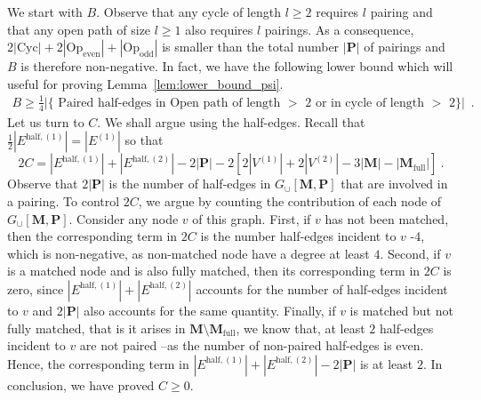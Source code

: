 \documentclass{article}
\begin{document}
We start with $B$. Observe that any cycle of length $l\geq 2$ requires $l$ pairing and that any open path of size $l\geq 1$ also requires $l$ pairings. As a consequence, $2|\mathrm{Cyc}| + 2|\mathrm{Op}_{\mathrm{even}}|+ |\mathrm{Op}_{\mathrm{odd}}|$ is smaller than the total number $|\mathbf{P}|$ of pairings and $B$ is therefore non-negative. In fact, we have the following lower bound which will useful for proving Lemma~\ref{lem:lower_bound_psi}. 
\begin{eqnarray}\label{eq:interpretation_B}
    B\geq \frac{1}{4}|\{\text{ Paired half-edges in Open path of length $>$ 2 or in cycle of length $>$ 2}\}| \enspace . 
\end{eqnarray}
Let us turn to $C$. We shall argue using the half-edges. Recall that  $\frac{1}{2}|E^{\mathrm{half},(1)}|=|E^{(1)}|$ so that 
\[
2C = |E^{\mathrm{half},(1)}| + |E^{\mathrm{half},(2)}| - 2|\mathbf{P}| - 2[2|V^{(1)}| + 2|V^{(2)}|-3|\mathbf{M}|-|\mathbf{M}_{\mathrm{full}}|]\ . 
\] 
Observe that $2|\mathbf{P}|$ is the number of half-edges in $G_{\cup}[\mathbf{M},\mathbf{P}]$ that are involved in a pairing. To control $2C$, we argue by counting the contribution of each node of  $G_{\cup}[\mathbf{M},\mathbf{P}]$. Consider any node $v$ of this graph. First, if $v$ has not been matched, then the corresponding term in $2C$ is 
the number half-edges incident to $v$ -4, which is non-negative, as non-matched node have a degree at least $4$. Second, if $v$ is a matched node and is also fully matched, then its corresponding term in $2C$ is zero, since $|E^{\mathrm{half},(1)}| + |E^{\mathrm{half},(2)}|$ accounts for the number of half-edges incident to $v$ and $2|\mathbf{P}|$ also accounts for the same quantity. Finally, if $v$ is matched but not fully matched, that is it arises in $\mathbf{M}\setminus \mathbf{M}_{\mathrm{full}}$, we know that, at least $2$ half-edges incident to $v$ are not paired --as the number of non-paired half-edges is even. Hence, the corresponding term in $|E^{\mathrm{half},(1)}| + |E^{\mathrm{half},(2)}| - 2|\mathbf{P}|$ is at least $2$. In conclusion, we have proved $C\geq 0$. 
\end{document}
